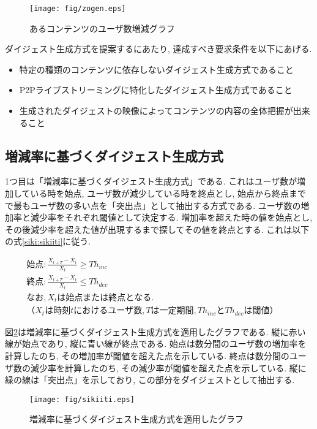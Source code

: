\newpage

\begin{figure}[h]
  \centering
  \texttt{[image: fig/zogen.eps]}
  \caption{あるコンテンツのユーザ数増減グラフ}
  \label{fig:zogen}
\end{figure}

ダイジェスト生成方式を提案するにあたり, 達成すべき要求条件を以下にあげる.

\begin{itemize}
\item 特定の種類のコンテンツに依存しないダイジェスト生成方式であること
\item P2Pライブストリーミングに特化したダイジェスト生成方式であること
\item 生成されたダイジェストの映像によってコンテンツの内容の全体把握が出来ること
\end{itemize}

\subsection{増減率に基づくダイジェスト生成方式}\label{subsec:pro-sikiiti}
1つ目は「増減率に基づくダイジェスト生成方式」である. これはユーザ数が増加している時を始点, ユーザ数が減少している時を終点とし, 始点から終点までで最もユーザ数の多い点を「突出点」として抽出する方式である. ユーザ数の増加率と減少率をそれぞれ閾値として決定する. 増加率を超えた時の値を始点とし, その後減少率を超えた値が出現するまで探してその値を終点とする.  これは以下の式\ref{siki:sikiiti}に従う.

\begin{eqnarray}
始点: \frac{X_{t+T}-X_{t}}{X_{t}} \geq Th_{inc} \nonumber \\
終点: \frac{X_{t+T}-X_{t}}{X_{t}} \leq Th_{dec} \nonumber \\
なお, X_{t}は始点または終点となる. \nonumber \\
（X_{t}は時刻tにおけるユーザ数,Tは一定期間, Th_{inc}とTh_{dec}は閾値）&&
\label{siki:sikiiti}
\end{eqnarray}


図\ref{fig:sikiiti}は増減率に基づくダイジェスト生成方式を適用したグラフである. 縦に赤い線が始点であり, 縦に青い線が終点である. 始点は数分間のユーザ数の増加率を計算したのち, その増加率が閾値を超えた点を示している. 終点は数分間のユーザ数の減少率を計算したのち, その減少率が閾値を超えた点を示している. 縦に緑の線は「突出点」を示しており, この部分をダイジェストとして抽出する.

\begin{figure}[h]
  \centering
  \texttt{[image: fig/sikiiti.eps]}
  \caption{増減率に基づくダイジェスト生成方式を適用したグラフ}
  \label{fig:sikiiti}
\end{figure}

